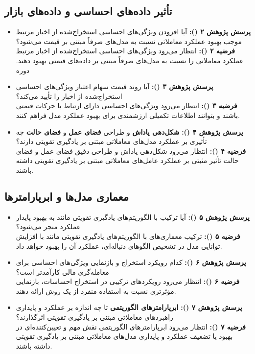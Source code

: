 \documentclass[12pt, a4paper]{report}
\begin{document}
\subsection*{تأثیر داده‌های احساسی و داده‌های بازار}
\begin{itemize}
\item \textbf{پرسش پژوهش ۲ ():} آیا افزودن ویژگی‌های احساسی استخراج‌شده از اخبار مرتبط موجب بهبود عملکرد معاملاتی نسبت به مدل‌های صرفاً مبتنی بر قیمت می‌شود؟ \\
\textbf{فرضیه ۲ ():} انتظار می‌رود ویژگی‌های احساسی استخراج‌شده از اخبار مرتبط عملکرد معاملاتی را نسبت به مدل‌های صرفاً مبتنی بر داده‌های قیمتی بهبود دهند.
دوره
\item \textbf{پرسش پژوهش ۳ ():} آیا روند قیمت سهام اعتبار ویژگی‌های احساسی استخراج‌شده از اخبار را تأیید می‌کند؟ \\
\textbf{فرضیه ۳ ():} انتظار می‌رود ویژگی‌های احساسی دارای ارتباط با حرکات قیمتی باشند و بتوانند اطلاعات تکمیلی ارزشمندی برای بهبود عملکرد مدل فراهم کنند.
    
    \item \textbf{پرسش پژوهش ۴ ():} \textbf{شکل‌دهی پاداش} و طراحی \textbf{فضای عمل} و \textbf{فضای حالت} چه تأثیری بر عملکرد مدل‌های معاملاتی مبتنی بر یادگیری تقویتی دارند؟ \\
    \textbf{فرضیه ۴ ():} انتظار می‌رود شکل‌دهی پاداش و طراحی دقیق فضای عمل و فضای حالت تأثیر مثبتی بر عملکرد عامل‌های معاملاتی مبتنی بر یادگیری تقویتی داشته باشند.
\end{itemize}

\subsection*{معماری مدل‌ها و ابرپارامترها}
\begin{itemize}
    \item \textbf{پرسش پژوهش ۵ ():} آیا ترکیب  با الگوریتم‌های یادگیری تقویتی مانند  به بهبود پایدار عملکرد منجر می‌شود؟ \\
    \textbf{فرضیه ۵ ():} ترکیب معماری‌های  با الگوریتم‌های یادگیری تقویتی مانند  با افزایش توانایی مدل در تشخیص الگوهای دنباله‌ای، عملکرد آن را بهبود خواهد داد.
        
\item \textbf{پرسش پژوهش ۶ ():} کدام رویکرد استخراج و بازنمایی ویژگی‌های احساسی برای معامله‌گری مالی کارآمدتر است؟ \\
\textbf{فرضیه ۶ ():} انتظار می‌رود رویکردهای ترکیبی در استخراج احساسات، بازنمایی مؤثرتری نسبت به استفاده منفرد از یک روش ارائه دهند.
    
    \item \textbf{پرسش پژوهش ۷ ():} \textbf{ابرپارامترهای الگوریتمی} تا چه اندازه بر عملکرد و پایداری راهبردهای معاملاتی مبتنی بر یادگیری تقویتی اثرگذارند؟ \\
    \textbf{فرضیه ۷ ():} انتظار می‌رود ابرپارامترهای الگوریتمی نقش مهم و تعیین‌کننده‌ای در بهبود یا تضعیف عملکرد و پایداری مدل‌های معاملاتی مبتنی بر یادگیری تقویتی داشته باشند.
\end{itemize}
\end{document}
